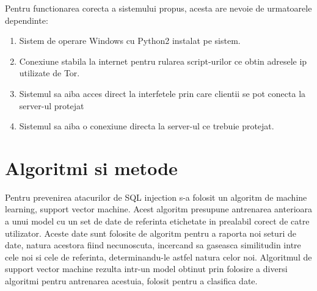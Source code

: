 Pentru functionarea corecta a sistemului propus, acesta are nevoie de urmatoarele dependinte:
\begin{enumerate}
	\item Sistem de operare Windows cu Python2 instalat pe sistem.
	\item Conexiune stabila la internet pentru rularea script-urilor ce obtin adresele ip utilizate de Tor.
	\item Sistemul sa aiba acces direct la interfetele prin care clientii se pot conecta la server-ul protejat
	\item Sistemul sa aiba o conexiune directa la server-ul ce trebuie protejat.
\end{enumerate}
\section{Algoritmi si metode}

Pentru prevenirea atacurilor de SQL injection s-a folosit un algoritm de machine learning, support vector machine. Acest algoritm presupune antrenarea anterioara a unui model cu un set de date de referinta etichetate in prealabil corect de catre utilizator. Aceste date sunt folosite de algoritm pentru a raporta noi seturi de date, natura acestora fiind necunoscuta, incercand sa gaseasca similitudin intre cele noi si cele de referinta, determinandu-le astfel natura celor noi. Algoritmul de support vector machine rezulta intr-un model obtinut prin folosire a diversi algoritmi pentru antrenarea acestuia, folosit pentru a clasifica date.

